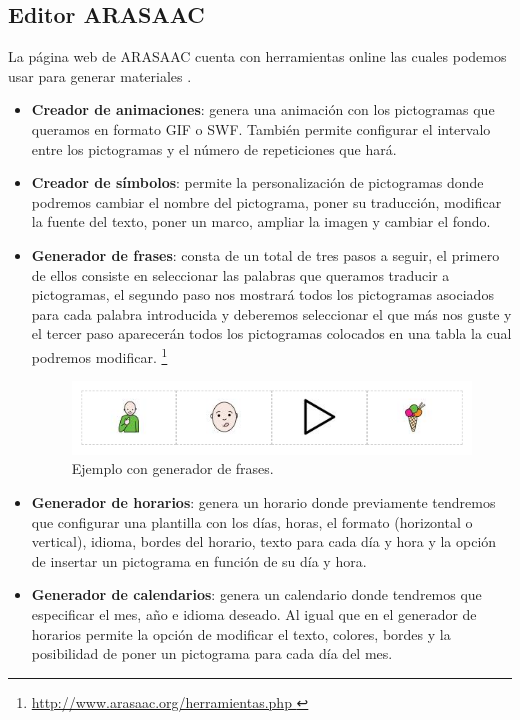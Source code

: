 \subsection{Editor ARASAAC}
La página web de ARASAAC cuenta con herramientas online las cuales podemos usar para generar materiales .
\begin{itemize}
\item \textbf{Creador de animaciones}: genera una animación con los pictogramas que queramos en formato GIF o SWF. También permite configurar el intervalo entre los pictogramas y el número de repeticiones que hará.

\item \textbf{Creador de símbolos}: permite la personalización de pictogramas donde podremos cambiar el nombre del pictograma, poner su traducción, modificar la fuente del texto, poner un marco, ampliar la imagen y cambiar el fondo.

\item \textbf{Generador de frases}: consta de un total de tres pasos a seguir, el primero de ellos consiste en seleccionar las palabras que queramos traducir a pictogramas, el segundo paso nos mostrará todos los pictogramas asociados para cada palabra introducida y deberemos seleccionar el que más nos guste y el tercer paso aparecerán todos los pictogramas colocados en una tabla la cual podremos modificar.
\footnote{\url{ http://www.arasaac.org/herramientas.php }}

\begin{figure}[h!]
	\centering
	\includegraphics[width=0.7\linewidth]{Imagenes/Bitmap/Frase ARASAAC}
	\caption{Ejemplo con generador de frases.}
	\label{fig:frase-arasaac}
\end{figure}


\item \textbf{Generador de horarios}: genera un horario donde previamente tendremos que configurar una plantilla con los días, horas, el formato (horizontal o vertical), idioma, bordes del horario, texto para cada día y hora y la opción de insertar un pictograma en función de su día y hora.

\item \textbf{Generador de calendarios}: genera un calendario donde tendremos que especificar el mes, año e idioma deseado. Al igual que en el generador de horarios permite la opción de modificar el texto, colores, bordes y la posibilidad de poner un pictograma para cada día del mes.


\end{itemize}
